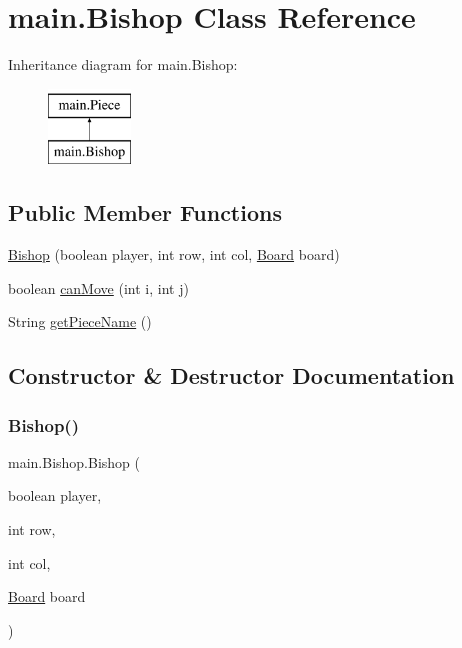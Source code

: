 \hypertarget{classmain_1_1_bishop}{}\section{main.\+Bishop Class Reference}
\label{classmain_1_1_bishop}
Inheritance diagram for main.\+Bishop\+:\begin{figure}[H]
\begin{center}
\leavevmode
\includegraphics[height=2.000000cm]{classmain_1_1_bishop}
\end{center}
\end{figure}
\subsection*{Public Member Functions}
\begin{DoxyCompactItemize}
\item 
\mbox{\hyperlink{classmain_1_1_bishop_a7ee2bc0d9a65c1e0c821c58f4a3746e6}{Bishop}} (boolean player, int row, int col, \mbox{\hyperlink{classmain_1_1_board}{Board}} board)
\item 
boolean \mbox{\hyperlink{classmain_1_1_bishop_af5f01fb2a3efd5ded53c144baaaf990e}{can\+Move}} (int i, int j)
\item 
String \mbox{\hyperlink{classmain_1_1_bishop_a8fefdb54888dcf7d5093c29645ec2a32}{get\+Piece\+Name}} ()
\end{DoxyCompactItemize}


\subsection{Constructor \& Destructor Documentation}
\mbox{\label{classmain_1_1_bishop_a7ee2bc0d9a65c1e0c821c58f4a3746e6}} 
\subsubsection{\texorpdfstring{Bishop()}{Bishop()}}
{\footnotesize\ttfamily main.\+Bishop.\+Bishop (\begin{DoxyParamCaption}\item[{boolean}]{player,  }\item[{int}]{row,  }\item[{int}]{col,  }\item[{\mbox{\hyperlink{classmain_1_1_board}{Board}}}]{board }\end{DoxyParamCaption})\hspace{0.3cm}{\ttfamily [inline]}}

